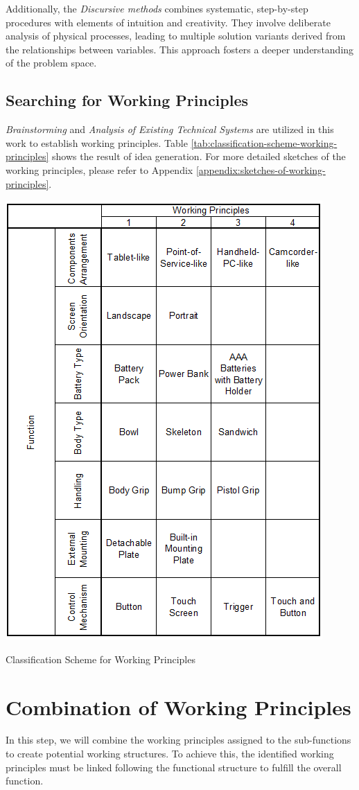 Additionally, the \textit{Discursive methods} \cite[89-103]{Pahl2007} combines systematic, step-by-step procedures with elements of intuition and creativity. They involve deliberate analysis of physical processes, leading to multiple solution variants derived from the relationships between variables. This approach fosters a deeper understanding of the problem space.

\subsection{Searching for Working Principles}
\textit{Brainstorming} and \textit{Analysis of Existing Technical Systems} are utilized in this work to establish working principles. Table \ref{tab:classification-scheme-working-principles} shows the result of idea generation. For more detailed sketches of the working principles, please refer to Appendix \ref{appendix:sketches-of-working-principles}.

\begin{table}[H]
    \centering
    \includegraphics[width=0.6\linewidth]{texs/Part1/chapter3/image/stotal.png}
    \caption{Classification Scheme for Working Principles}
    \label{tab:classification-scheme-working-principles}
\end{table}


\section{Combination of Working Principles}
In this step, we will combine the working principles assigned to the sub-functions to create potential working structures. To achieve this, the identified working principles must be linked following the functional structure to fulfill the overall function.

